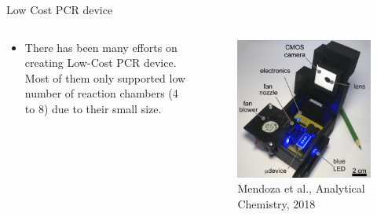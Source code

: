 \documentclass[UKenglish, aspectratio = 169]{beamer}
\begin{document}
\begin{frame}{Low Cost PCR device}
	\begin{columns}
		\begin{column}[T]{0.5\textwidth}
			\vspace*{4ex}
			\begin{itemize}
				\item There has been many efforts on creating Low-Cost PCR device. Most of them only supported low number of reaction chambers (4 to 8) due to their small size.
			\end{itemize}
		\end{column}
		\begin{column}{0.5\textwidth}
			\begin{figure}
				\centering
				\includegraphics[scale=0.25]{OM-images/pcr1.png}
				\caption{\tiny{Mendoza et al., Analytical Chemistry, 2018}}
			\end{figure}
		\end{column}
	\end{columns}
\end{frame}
\end{document}
